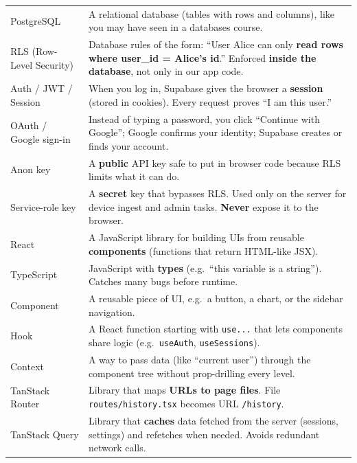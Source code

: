 \documentclass[11pt,a4paper]{article}
\newcommand{\filepath}[1]{\texttt{#1}}
\begin{document}
\begin{longtable}{@{}p{3.2cm}p{10.5cm}@{}}
PostgreSQL &
A relational database (tables with rows and columns), like you may have seen in a databases course. \\

RLS (Row-Level Security) &
Database rules of the form: ``User Alice can only \textbf{read rows where user\_id = Alice's id}.'' Enforced \textbf{inside the database}, not only in our app code. \\

Auth / JWT / Session &
When you log in, Supabase gives the browser a \textbf{session} (stored in cookies). Every request proves ``I am this user.'' \\

OAuth / Google sign-in &
Instead of typing a password, you click ``Continue with Google''; Google confirms your identity; Supabase creates or finds your account. \\

Anon key &
A \textbf{public} API key safe to put in browser code because RLS limits what it can do. \\

Service-role key &
A \textbf{secret} key that bypasses RLS. Used only on the server for device ingest and admin tasks. \textbf{Never} expose it to the browser. \\

React &
A JavaScript library for building UIs from reusable \textbf{components} (functions that return HTML-like JSX). \\

TypeScript &
JavaScript with \textbf{types} (e.g.\ ``this variable is a string''). Catches many bugs before runtime. \\

Component &
A reusable piece of UI, e.g.\ a button, a chart, or the sidebar navigation. \\

Hook &
A React function starting with \texttt{use...} that lets components share logic (e.g.\ \texttt{useAuth}, \texttt{useSessions}). \\

Context &
A way to pass data (like ``current user'') through the component tree without prop-drilling every level. \\

TanStack Router &
Library that maps \textbf{URLs to page files}. File \filepath{routes/history.tsx} becomes URL \filepath{/history}. \\

TanStack Query &
Library that \textbf{caches} data fetched from the server (sessions, settings) and refetches when needed. Avoids redundant network calls. \\


\end{longtable}
\end{document}
